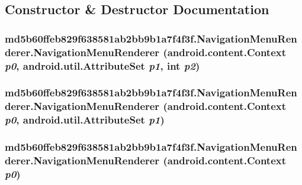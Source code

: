 \subsection{Constructor \& Destructor Documentation}
\hypertarget{classmd5b60ffeb829f638581ab2bb9b1a7f4f3f_1_1_navigation_menu_renderer_e74ab61a213bee8a3bbfcd4d6caa561c}{
\subsubsection[{NavigationMenuRenderer}]{\setlength{\rightskip}{0pt plus 5cm}md5b60ffeb829f638581ab2bb9b1a7f4f3f.NavigationMenuRenderer.NavigationMenuRenderer (android.content.Context {\em p0}, \/  android.util.AttributeSet {\em p1}, \/  int {\em p2})}}
\label{classmd5b60ffeb829f638581ab2bb9b1a7f4f3f_1_1_navigation_menu_renderer_e74ab61a213bee8a3bbfcd4d6caa561c}


\hypertarget{classmd5b60ffeb829f638581ab2bb9b1a7f4f3f_1_1_navigation_menu_renderer_d19d1ffa5f6f7658e40c2aad315f1531}{
\subsubsection[{NavigationMenuRenderer}]{\setlength{\rightskip}{0pt plus 5cm}md5b60ffeb829f638581ab2bb9b1a7f4f3f.NavigationMenuRenderer.NavigationMenuRenderer (android.content.Context {\em p0}, \/  android.util.AttributeSet {\em p1})}}
\label{classmd5b60ffeb829f638581ab2bb9b1a7f4f3f_1_1_navigation_menu_renderer_d19d1ffa5f6f7658e40c2aad315f1531}


\hypertarget{classmd5b60ffeb829f638581ab2bb9b1a7f4f3f_1_1_navigation_menu_renderer_b221cd03a920958ca9a3c7cce213642f}{
\subsubsection[{NavigationMenuRenderer}]{\setlength{\rightskip}{0pt plus 5cm}md5b60ffeb829f638581ab2bb9b1a7f4f3f.NavigationMenuRenderer.NavigationMenuRenderer (android.content.Context {\em p0})}}
\label{classmd5b60ffeb829f638581ab2bb9b1a7f4f3f_1_1_navigation_menu_renderer_b221cd03a920958ca9a3c7cce213642f}




